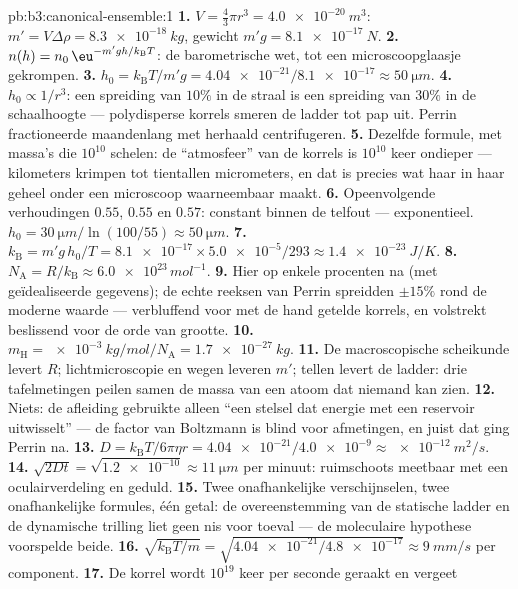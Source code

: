 \begin{solution}{pb:b3:canonical-ensemble:1}
\textbf{1.} $V = \tfrac43\pi r^3 = \qty{4.0e-20}{m^3}$: $m' = V
\Delta\rho = \qty{8.3e-18}{kg}$, gewicht $m'g = \qty{8.1e-17}{N}$.
\textbf{2.} $n(h) = n_0\,\eu^{-m'gh/k_{\text{B}}T}$: de barometrische wet,
tot een microscoopglaasje gekrompen.
\textbf{3.} $h_0 = k_{\text{B}}T/m'g = \num{4.04e-21}/\num{8.1e-17}
\approx \qty{50}{\micro m}$.
\textbf{4.} $h_0 \propto 1/r^3$: een spreiding van $10\%$ in de straal is
een spreiding van $30\%$ in de schaalhoogte --- polydisperse korrels
smeren de ladder tot pap uit. Perrin fractioneerde maandenlang met
herhaald centrifugeren.
\textbf{5.} Dezelfde formule, met massa's die $10^{10}$ schelen: de
``atmosfeer'' van de korrels is $10^{10}$ keer ondieper --- kilometers
krimpen tot tientallen micrometers, en dat is precies wat haar in haar
geheel onder een microscoop waarneembaar maakt.
\textbf{6.} Opeenvolgende verhoudingen $0.55$, $0.55$ en $0.57$: constant
binnen de telfout --- exponentieel. $h_0 =
\qty{30}{\micro m}/\ln(100/55) \approx \qty{50}{\micro m}$.
\textbf{7.} $k_{\text{B}} = m'g\,h_0/T = \num{8.1e-17} \times
\num{5.0e-5}/293 \approx \qty{1.4e-23}{J/K}$.
\textbf{8.} $N_{\text{A}} = R/k_{\text{B}} \approx
\num{6.0e23}\,\unit{mol^{-1}}$.
\textbf{9.} Hier op enkele procenten na (met geïdealiseerde gegevens); de
echte reeksen van Perrin spreidden $\pm15\%$ rond de moderne waarde ---
verbluffend voor met de hand getelde korrels, en volstrekt beslissend voor
de orde van grootte.
\textbf{10.} $m_{\text{H}} = \qty{e-3}{kg/mol}/N_{\text{A}} =
\qty{1.7e-27}{kg}$.
\textbf{11.} De macroscopische scheikunde levert $R$; lichtmicroscopie en
wegen leveren $m'$; tellen levert de ladder: drie tafelmetingen peilen
samen de massa van een atoom dat niemand kan zien.
\textbf{12.} Niets: de afleiding gebruikte alleen ``een stelsel dat energie
met een reservoir uitwisselt'' --- de factor van Boltzmann is blind voor
afmetingen, en juist dat ging Perrin na.
\textbf{13.} $D = k_{\text{B}}T/6\pi\eta r =
\num{4.04e-21}/\num{4.0e-9} \approx \qty{e-12}{m^2/s}$.
\textbf{14.} $\sqrt{2Dt} = \sqrt{\num{1.2e-10}} \approx
\qty{11}{\micro m}$ per minuut: ruimschoots meetbaar met een
oculairverdeling en geduld.
\textbf{15.} Twee onafhankelijke verschijnselen, twee onafhankelijke
formules, één getal: de overeenstemming van de statische ladder en de
dynamische trilling liet geen nis voor toeval --- de moleculaire hypothese
voorspelde beide.
\textbf{16.} $\sqrt{k_{\text{B}}T/m} = \sqrt{\num{4.04e-21}/
\num{4.8e-17}} \approx \qty{9}{mm/s}$ per component.
\textbf{17.} De korrel wordt $10^{19}$ keer per seconde geraakt en vergeet

\end{solution}
